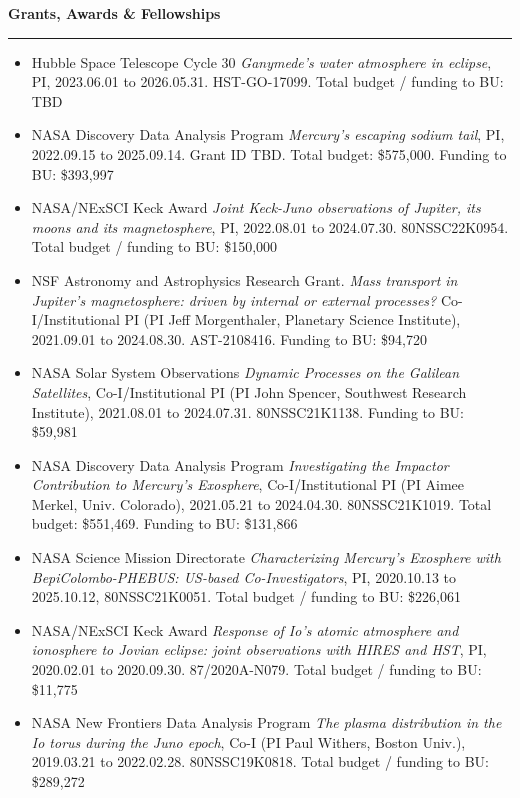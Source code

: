 \documentclass[12pt]{report}
\begin{document}
\noindent\bf{Grants, Awards \& Fellowships}\rm \hspace*{\fill} \\
\rule{\textwidth}{1pt}
\begin{itemize} \itemsep -2pt %
 \item Hubble Space Telescope Cycle 30 {\it Ganymede's water atmosphere in eclipse}, PI, 2023.06.01 to 2026.05.31. HST-GO-17099. Total budget / funding to BU: TBD
 \item NASA Discovery Data Analysis Program {\it  Mercury's escaping sodium tail}, PI, 2022.09.15 to 2025.09.14. Grant ID TBD. Total budget: \$575,000. Funding to BU: \$393,997
 \item NASA/NExSCI Keck Award {\it Joint Keck-Juno observations of Jupiter, its moons and its magnetosphere}, PI, 2022.08.01 to 2024.07.30. 80NSSC22K0954. Total budget / funding to BU: \$150,000
 \item NSF Astronomy and Astrophysics Research Grant. {\it Mass transport in Jupiter's magnetosphere: driven by internal or external processes?} Co-I/Institutional PI (PI Jeff Morgenthaler, Planetary Science Institute), 2021.09.01 to 2024.08.30. AST-2108416. Funding to BU: \$94,720
 \item NASA Solar System Observations {\it Dynamic Processes on the Galilean Satellites}, Co-I/Institutional PI (PI John Spencer, Southwest Research Institute), 2021.08.01 to 2024.07.31. 80NSSC21K1138. Funding to BU: \$59,981
 \item NASA Discovery Data Analysis Program {\it Investigating the Impactor Contribution to Mercury's Exosphere}, Co-I/Institutional PI (PI Aimee Merkel, Univ. Colorado), 2021.05.21 to 2024.04.30. 80NSSC21K1019. Total budget: \$551,469. Funding to BU: \$131,866
 \item NASA Science Mission Directorate {\it Characterizing Mercury’s Exosphere with BepiColombo-PHEBUS: US-based Co-Investigators}, PI, 2020.10.13 to 2025.10.12, 80NSSC21K0051. Total budget / funding to BU: \$226,061
 \item NASA/NExSCI Keck Award {\it Response of Io's atomic atmosphere and ionosphere to Jovian eclipse: joint observations with HIRES and HST}, PI, 2020.02.01 to 2020.09.30. 87/2020A-N079. Total budget / funding to BU: \$11,775
 \item NASA New Frontiers Data Analysis Program {\it The plasma distribution in the Io torus during the Juno epoch}, Co-I (PI Paul Withers, Boston Univ.), 2019.03.21 to 2022.02.28. 80NSSC19K0818. Total budget / funding to BU: \$289,272

\end{itemize}
\end{document}
